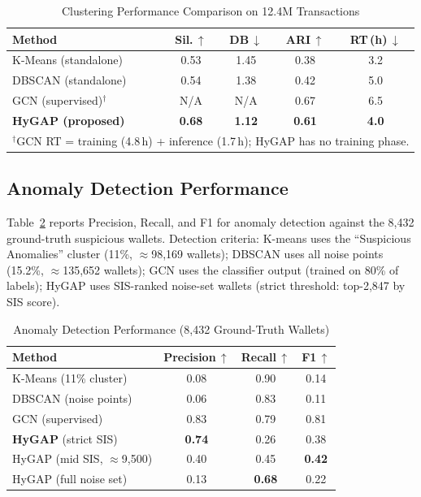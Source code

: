 \documentclass[conference]{IEEEtran}
\begin{document}
\begin{table}[t]
\caption{Clustering Performance Comparison on 12.4M Transactions}
\label{tab:compare}
\centering
\begin{tabular}{@{}lcccc@{}}
\toprule
\textbf{Method} & \textbf{Sil.\,$\uparrow$} &
\textbf{DB\,$\downarrow$} & \textbf{ARI\,$\uparrow$} &
\textbf{RT\,(h)\,$\downarrow$} \\
\midrule
K-Means (standalone)      & 0.53 & 1.45 & 0.38 & 3.2 \\
DBSCAN (standalone)       & 0.54 & 1.38 & 0.42 & 5.0 \\
GCN (supervised)$^\dagger$& N/A  & N/A  & 0.67 & 6.5 \\
\textbf{HyGAP (proposed)} & \textbf{0.68} & \textbf{1.12} &
                            \textbf{0.61} & \textbf{4.0} \\
\midrule
\multicolumn{5}{l}{{\scriptsize $^\dagger$GCN RT = training
(4.8\,h) + inference (1.7\,h); HyGAP has no training phase.}} \\
\bottomrule
\end{tabular}
\end{table}

\subsection{Anomaly Detection Performance}
Table~\ref{tab:anomaly} reports Precision, Recall, and F1 for
anomaly detection against the 8{,}432 ground-truth suspicious
wallets. Detection criteria: K-means uses the ``Suspicious
Anomalies'' cluster (11\%, $\approx$98{,}169 wallets); DBSCAN
uses all noise points (15.2\%, $\approx$135{,}652 wallets); GCN
uses the classifier output (trained on 80\% of labels); HyGAP
uses SIS-ranked noise-set wallets (strict threshold:
top-2{,}847 by SIS score).

\begin{table}[t]
\caption{Anomaly Detection Performance (8{,}432 Ground-Truth Wallets)}
\label{tab:anomaly}
\centering
\begin{tabular}{@{}lccc@{}}
\toprule
\textbf{Method} & \textbf{Precision\,$\uparrow$} &
\textbf{Recall\,$\uparrow$} & \textbf{F1\,$\uparrow$} \\
\midrule
K-Means (11\% cluster)       & 0.08 & 0.90 & 0.14 \\
DBSCAN (noise points)        & 0.06 & 0.83 & 0.11 \\
GCN (supervised)             & 0.83 & 0.79 & 0.81 \\
\textbf{HyGAP} (strict SIS)  & \textbf{0.74} & 0.26 & 0.38 \\
HyGAP (mid SIS, $\approx$9{,}500)  & 0.40 & 0.45 & \textbf{0.42} \\
HyGAP (full noise set)       & 0.13 & \textbf{0.68} & 0.22 \\
\bottomrule
\end{tabular}
\end{table}
\end{document}
